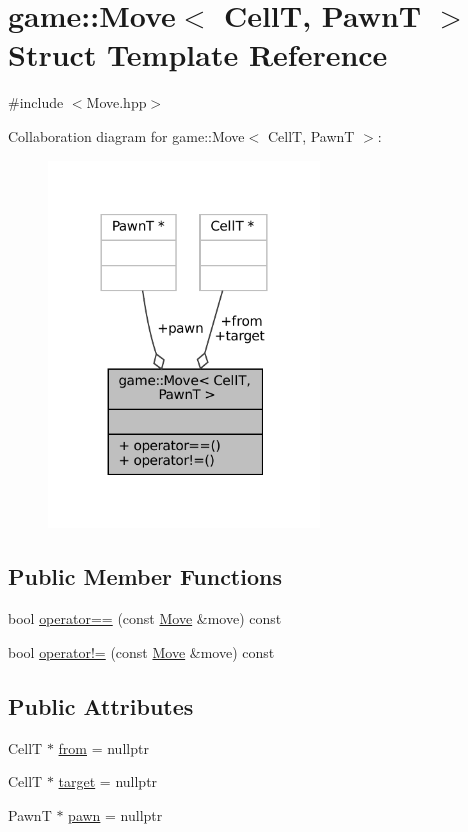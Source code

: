 \hypertarget{structgame_1_1_move}{}\section{game\+:\+:Move$<$ CellT, PawnT $>$ Struct Template Reference}
\label{structgame_1_1_move}


{\ttfamily \#include $<$Move.\+hpp$>$}



Collaboration diagram for game\+:\+:Move$<$ CellT, PawnT $>$\+:
\nopagebreak
\begin{figure}[H]
\begin{center}
\leavevmode
\includegraphics[width=204pt]{structgame_1_1_move__coll__graph}
\end{center}
\end{figure}
\subsection*{Public Member Functions}
\begin{DoxyCompactItemize}
\item 
bool \hyperlink{structgame_1_1_move_a918b67ede1970df0d939c22244d739a1}{operator==} (const \hyperlink{structgame_1_1_move}{Move} \&move) const
\item 
bool \hyperlink{structgame_1_1_move_a0c266ecff843b21cafcd55c2d7bced38}{operator!=} (const \hyperlink{structgame_1_1_move}{Move} \&move) const
\end{DoxyCompactItemize}
\subsection*{Public Attributes}
\begin{DoxyCompactItemize}
\item 
CellT $\ast$ \hyperlink{structgame_1_1_move_a62701eabfac32f5f950e69df1d82ed90}{from} = nullptr
\item 
CellT $\ast$ \hyperlink{structgame_1_1_move_a046beb273056ca6a165a7f896e6a7637}{target} = nullptr
\item 
PawnT $\ast$ \hyperlink{structgame_1_1_move_a085ad168dfef06addac771300768b984}{pawn} = nullptr
\end{DoxyCompactItemize}


